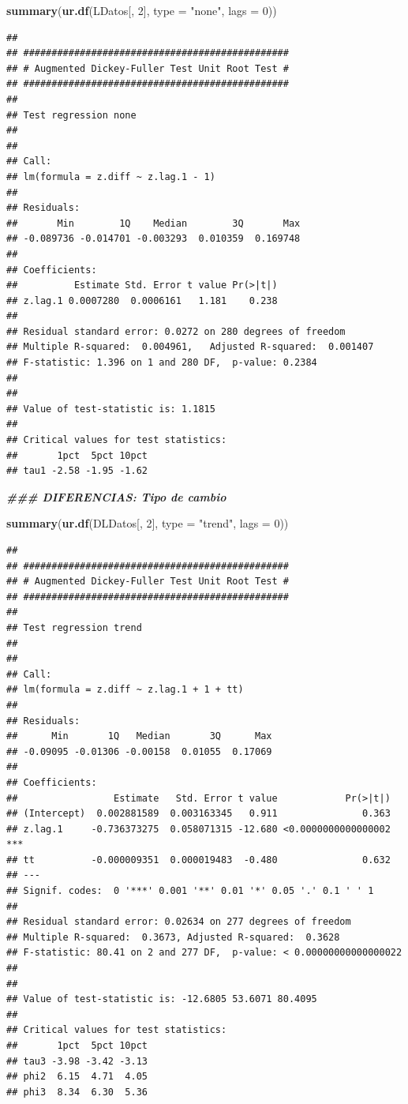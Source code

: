 \documentclass[
]{book}
\newenvironment{Shaded}{\begin{snugshade}}{\end{snugshade}}
\newcommand{\AttributeTok}[1]{\textcolor[rgb]{0.13,0.29,0.53}{#1}}
\newcommand{\DecValTok}[1]{\textcolor[rgb]{0.00,0.00,0.81}{#1}}
\newcommand{\DocumentationTok}[1]{\textcolor[rgb]{0.56,0.35,0.01}{\textbf{\textit{#1}}}}
\newcommand{\FunctionTok}[1]{\textcolor[rgb]{0.13,0.29,0.53}{\textbf{#1}}}
\newcommand{\NormalTok}[1]{#1}
\newcommand{\StringTok}[1]{\textcolor[rgb]{0.31,0.60,0.02}{#1}}
\begin{document}
\begin{Shaded}
\begin{Highlighting}[]
\FunctionTok{summary}\NormalTok{(}\FunctionTok{ur.df}\NormalTok{(LDatos[, }\DecValTok{2}\NormalTok{], }\AttributeTok{type =} \StringTok{"none"}\NormalTok{, }\AttributeTok{lags =} \DecValTok{0}\NormalTok{))}
\end{Highlighting}
\end{Shaded}

\begin{verbatim}
## 
## ############################################### 
## # Augmented Dickey-Fuller Test Unit Root Test # 
## ############################################### 
## 
## Test regression none 
## 
## 
## Call:
## lm(formula = z.diff ~ z.lag.1 - 1)
## 
## Residuals:
##       Min        1Q    Median        3Q       Max 
## -0.089736 -0.014701 -0.003293  0.010359  0.169748 
## 
## Coefficients:
##          Estimate Std. Error t value Pr(>|t|)
## z.lag.1 0.0007280  0.0006161   1.181    0.238
## 
## Residual standard error: 0.0272 on 280 degrees of freedom
## Multiple R-squared:  0.004961,   Adjusted R-squared:  0.001407 
## F-statistic: 1.396 on 1 and 280 DF,  p-value: 0.2384
## 
## 
## Value of test-statistic is: 1.1815 
## 
## Critical values for test statistics: 
##       1pct  5pct 10pct
## tau1 -2.58 -1.95 -1.62
\end{verbatim}

\begin{Shaded}
\begin{Highlighting}[]
\DocumentationTok{\#\#\# DIFERENCIAS: Tipo de cambio}

\FunctionTok{summary}\NormalTok{(}\FunctionTok{ur.df}\NormalTok{(DLDatos[, }\DecValTok{2}\NormalTok{], }\AttributeTok{type =} \StringTok{"trend"}\NormalTok{, }\AttributeTok{lags =} \DecValTok{0}\NormalTok{))}
\end{Highlighting}
\end{Shaded}

\begin{verbatim}
## 
## ############################################### 
## # Augmented Dickey-Fuller Test Unit Root Test # 
## ############################################### 
## 
## Test regression trend 
## 
## 
## Call:
## lm(formula = z.diff ~ z.lag.1 + 1 + tt)
## 
## Residuals:
##      Min       1Q   Median       3Q      Max 
## -0.09095 -0.01306 -0.00158  0.01055  0.17069 
## 
## Coefficients:
##                 Estimate   Std. Error t value            Pr(>|t|)    
## (Intercept)  0.002881589  0.003163345   0.911               0.363    
## z.lag.1     -0.736373275  0.058071315 -12.680 <0.0000000000000002 ***
## tt          -0.000009351  0.000019483  -0.480               0.632    
## ---
## Signif. codes:  0 '***' 0.001 '**' 0.01 '*' 0.05 '.' 0.1 ' ' 1
## 
## Residual standard error: 0.02634 on 277 degrees of freedom
## Multiple R-squared:  0.3673, Adjusted R-squared:  0.3628 
## F-statistic: 80.41 on 2 and 277 DF,  p-value: < 0.00000000000000022
## 
## 
## Value of test-statistic is: -12.6805 53.6071 80.4095 
## 
## Critical values for test statistics: 
##       1pct  5pct 10pct
## tau3 -3.98 -3.42 -3.13
## phi2  6.15  4.71  4.05
## phi3  8.34  6.30  5.36
\end{verbatim}
\end{document}
